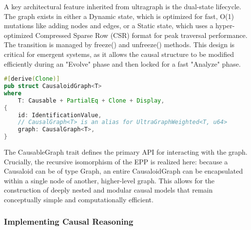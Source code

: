 A key architectural feature inherited from ultragraph is the dual-state lifecycle. The graph exists in either a Dynamic state, which is optimized for fast, O(1) mutations like adding nodes and edges, or a Static state, which uses a hyper-optimized Compressed Sparse Row (CSR) format for peak traversal performance. The transition is managed by freeze() and unfreeze() methods. This design is critical for emergent systems, as it allows the causal structure to be modified efficiently during an "Evolve" phase and then locked for a fast "Analyze" phase.

\begin{lstlisting}[language=Rust, label={list:CausaloidGraphStruct}, caption={The DeepCausality CausaloidGraph Struct}]
#[derive(Clone)]
pub struct CausaloidGraph<T>
where
    T: Causable + PartialEq + Clone + Display,
{
    id: IdentificationValue,
    // CausalGraph<T> is an alias for UltraGraphWeighted<T, u64>
    graph: CausalGraph<T>, 
}
\end{lstlisting}

The CausableGraph trait defines the primary API for interacting with the graph. Crucially, the recursive isomorphism of the EPP is realized here: because a Causaloid can be of type Graph, an entire CausaloidGraph can be encapsulated within a single node of another, higher-level graph. This allows for the construction of deeply nested and modular causal models that remain conceptually simple and computationally efficient.


\subsubsection{Implementing Causal Reasoning}
\label{sec:implementation_causal_reasoning}


